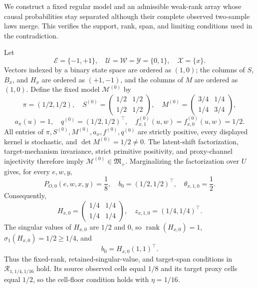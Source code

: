 We construct a fixed regular model and an admissible weak-rank array whose causal probabilities stay separated although their complete observed two-sample laws merge.  This verifies the support, rank, span, and limiting conditions used in the contradiction.

Let
\[
\mathcal E=\{-1,+1\},\quad
\mathcal U=\mathcal W=\mathcal Y=\{0,1\},\quad
\mathcal X=\{x\}.
\]
Vectors indexed by a binary state space are ordered as \((1,0)\); the columns of \(S\), \(B_x\), and \(H_x\) are ordered as \((+1,-1)\), and the columns of \(M\) are ordered as \((1,0)\).  Define the fixed model \(\mathcal M^{(0)}\) by
\[
\pi=(1/2,1/2),\quad
S^{(0)}=
\begin{pmatrix}1/2&1/2\\1/2&1/2\end{pmatrix},\quad
M^{(0)}=
\begin{pmatrix}3/4&1/4\\1/4&3/4\end{pmatrix},
\]
\[
a_x(u)=1,\quad q^{(0)}=(1/2,1/2)^{\top},\quad
f^{(0)}_{x,1}(u,w)=f^{(0)}_{x,0}(u,w)=1/2.
\]
All entries of \(\pi,S^{(0)},M^{(0)},a_x,f^{(0)},q^{(0)}\) are strictly positive, every displayed kernel is stochastic, and \(\det M^{(0)}=1/2\ne0\).  The latent-shift factorization, target-mechanism invariance, strict primitive positivity, and proxy-channel injectivity therefore imply \(\mathcal M^{(0)}\in\mathfrak M_{+}\).  Marginalizing the factorization over \(U\) gives, for every \(e,w,y\),
\[
P_{O,0}(e,w,x,y)=\frac18,\quad
b_0=(1/2,1/2)^{\top},\quad
\theta_{x,1,0}=\frac12.
\]
Consequently,
\[
H_{x,0}=
\begin{pmatrix}1/4&1/4\\1/4&1/4\end{pmatrix},
\quad z_{x,1,0}=(1/4,1/4)^{\top}.
\]
The singular values of \(H_{x,0}\) are \(1/2\) and \(0\), so \(\operatorname{rank}(H_{x,0})=1\), \(\sigma_1(H_{x,0})=1/2\ge1/4\), and
\[
b_0=H_{x,0}(1,1)^{\top}.
\]
Thus the fixed-rank, retained-singular-value, and target-span conditions in \(\mathcal R_{1,1/4,1/16}\) hold.  Its source observed cells equal \(1/8\) and its target proxy cells equal \(1/2\), so the cell-floor condition holds with \(\eta=1/16\).

